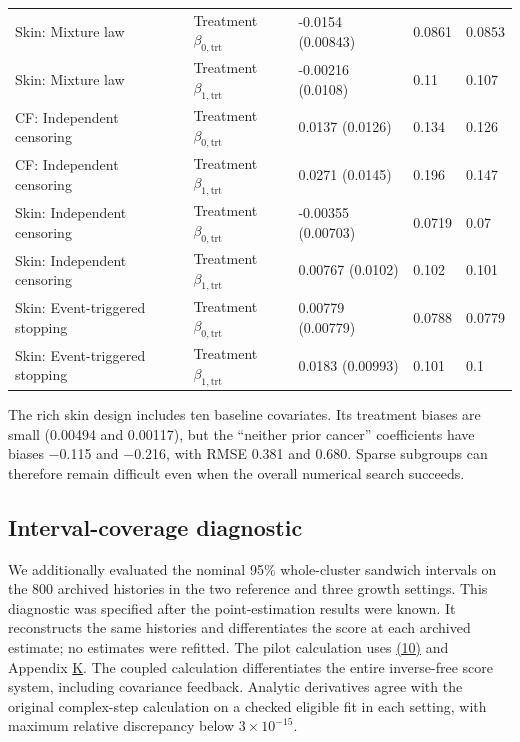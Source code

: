 \documentclass[11pt]{article}
\begin{document}
{\begin{longtable}{lllll}
Skin: Mixture law & Treatment \(\beta_{0,\mathrm{trt}}\) & -0.0154 (0.00843) & 0.0861 & 0.0853 \\
Skin: Mixture law & Treatment \(\beta_{1,\mathrm{trt}}\) & -0.00216 (0.0108) & 0.11 & 0.107 \\
CF: Independent censoring & Treatment \(\beta_{0,\mathrm{trt}}\) & 0.0137 (0.0126) & 0.134 & 0.126 \\
CF: Independent censoring & Treatment \(\beta_{1,\mathrm{trt}}\) & 0.0271 (0.0145) & 0.196 & 0.147 \\
Skin: Independent censoring & Treatment \(\beta_{0,\mathrm{trt}}\) & -0.00355 (0.00703) & 0.0719 & 0.07 \\
Skin: Independent censoring & Treatment \(\beta_{1,\mathrm{trt}}\) & 0.00767 (0.0102) & 0.102 & 0.101 \\
Skin: Event-triggered stopping & Treatment \(\beta_{0,\mathrm{trt}}\) & 0.00779 (0.00779) & 0.0788 & 0.0779 \\
Skin: Event-triggered stopping & Treatment \(\beta_{1,\mathrm{trt}}\) & 0.0183 (0.00993) & 0.101 & 0.1 \\
\end{longtable}}

The rich skin design includes ten baseline covariates. Its treatment biases are small (0.00494 and 0.00117), but the ``neither prior cancer'' coefficients have biases $-$0.115 and $-$0.216, with RMSE 0.381 and 0.680. Sparse subgroups can therefore remain difficult even when the overall numerical search succeeds.

\subsection{Interval-coverage diagnostic}\label{sec:6.8}

We additionally evaluated the nominal 95\% whole-cluster sandwich intervals on the 800 archived histories in the two reference and three growth settings. This diagnostic was specified after the point-estimation results were known. It reconstructs the same histories and differentiates the score at each archived estimate; no estimates were refitted. The pilot calculation uses \hyperref[eq:10]{(10)} and Appendix \hyperref[sec:K]{K}. The coupled calculation differentiates the entire inverse-free score system, including covariance feedback. Analytic derivatives agree with the original complex-step calculation on a checked eligible fit in each setting, with maximum relative discrepancy below \(3\times10^{-15}\).
\end{document}
